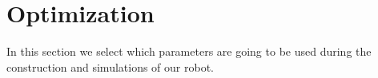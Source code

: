 \section{Optimization}
In this section we select which parameters are going to be used during the construction 
and simulations of our robot.





